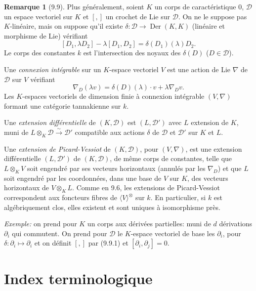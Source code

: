 \documentclass[12pt,a4paper]{article}
\theoremstyle{plain}
\theoremstyle{definition}
\newtheorem{remark}[theorem]{Remarque}
\DeclareMathOperator{\Der}{Der}
\begin{document}
\begin{remark}[9.9]
Plus généralement, soient $K$ un corps de caractéristique 0, $\mathcal{D}$ un espace vectoriel sur $K$ et $[,]$ un crochet de Lie sur $\mathcal{D}$. On ne le suppose pas $K$-linéaire, mais on suppose qu'il existe $\delta : \mathcal{D} \to \Der(K, K)$ (linéaire et morphisme de Lie) vérifiant
\begin{equation}\label{eq:9.9.1}
[D_1, \lambda D_2] - \lambda[D_1, D_2] = \delta(D_1)(\lambda) D_2.
\end{equation}
Le corps des constantes $k$ est l'intersection des noyaux des $\delta(D)$ ($D \in \mathcal{D}$).

Une \emph{connexion intégrable} sur un $K$-espace vectoriel $V$ est une action de Lie $\nabla$ de $\mathcal{D}$ sur $V$ vérifiant
\[
\nabla_D(\lambda v) = \delta(D)(\lambda) \cdot v + \lambda \nabla_D v.
\]
Les $K$-espaces vectoriels de dimension finie à connexion intégrable $(V, \nabla)$ formant une catégorie tannakienne sur $k$.

Une \emph{extension différentielle} de $(K, \mathcal{D})$ est $(L, \mathcal{D}')$ avec $L$ extension de $K$, muni de $L \otimes_K \mathcal{D} \xrightarrow{\sim} \mathcal{D}'$ compatible aux actions $\delta$ de $\mathcal{D}$ et $\mathcal{D}'$ sur $K$ et $L$.

Une \emph{extension de Picard-Vessiot} de $(K, \mathcal{D})$, pour $(V, \nabla)$, est une extension différentielle $(L, \mathcal{D}')$ de $(K, \mathcal{D})$, de même corps de constantes, telle que $L \otimes_K V$ soit engendré par ses vecteurs horizontaux (annulés par les $\nabla_D$) et que $L$ soit engendré par les coordonnées, dans une base de $V$ sur $K$, des vecteurs horizontaux de $V \otimes_K L$. Comme en 9.6, les extensions de Picard-Vessiot correspondent aux foncteurs fibres de $\langle V \rangle^\otimes$ sur $k$. En particulier, si $k$ est algébriquement clos, elles existent et sont uniques à isomorphisme près.

\textit{Exemple:} on prend pour $K$ un corps aux dérivées partielles: muni de $d$ dérivations $\partial_i$ qui commutent. On prend pour $\mathcal{D}$ le $K$-espace vectoriel de base les $\partial_i$, pour $\delta : \partial_i \mapsto \partial_i$ et on définit $[,]$ par (9.9.1) et $[\partial_i, \partial_j] = 0$.
\end{remark}

\section*{Index terminologique}
\end{document}
